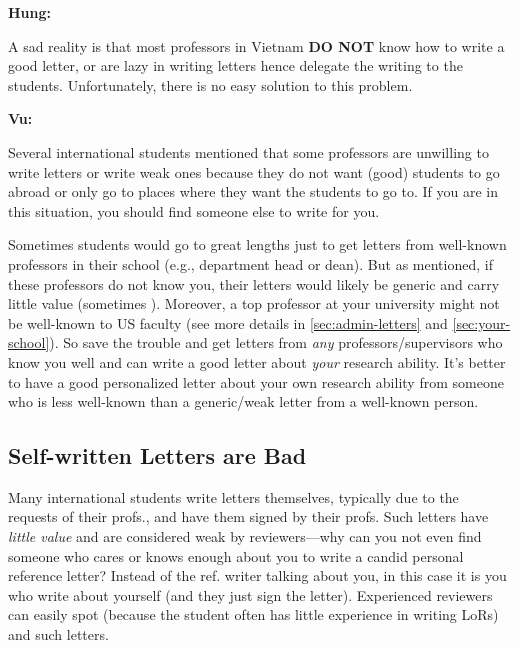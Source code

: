 \documentclass[oneside,11pt,dvipsnames]{book}
\newenvironment{commentbox}[1][]{
  \small
  \begin{mybox}
    {\small \textbf{#1}}
  }{
  \end{mybox}
}
\newcommand{\red}[1]{{\color{red}{#1}}}
\begin{document}
\begin{commentbox}[Hung:]
  A sad reality is that most professors in Vietnam \textbf{DO NOT} know how to write a good letter, or are lazy in writing letters hence delegate the writing to the students. Unfortunately, there is no easy solution to this problem.
\end{commentbox}

\begin{commentbox}[Vu:]

  Several international students mentioned that some professors are unwilling to write letters or write weak ones because they do not want (good) students to go abroad or only go to places where they want the students to go to. If you are in this situation, you should find someone else to write for you.
  \tcblower

Sometimes students would go to great lengths just to get letters from well-known professors in their school (e.g., department head or dean). But as mentioned, if these professors do not know you, their letters would likely be generic and carry little value (sometimes \red{red flags}). Moreover, a top professor at your university might not be well-known to US faculty (see more details in \autoref{sec:admin-letters} and \autoref{sec:your-school}). So save the trouble and get letters from \emph{any} professors/supervisors who know you well and can write a good letter about \emph{your} research ability. It's better to have a good personalized letter about your own research ability from someone who is less well-known than a generic/weak letter from a well-known person.

\end{commentbox}


\subsection{Self-written Letters are Bad} Many international students write letters themselves, typically due to the requests of their profs., and have them signed by their profs. Such letters have \emph{little value} and are considered weak by reviewers---why can you not even find someone who cares or knows enough about you to write a candid personal reference letter?  Instead of the ref. writer talking about you, in this case it is you who write about yourself (and they just sign the letter). Experienced reviewers can easily spot  (because the student often has little experience in writing LoRs) and  \red{red flag} such letters.
\end{document}

